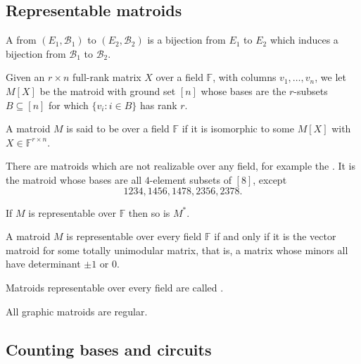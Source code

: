 \subsection[matroidRealizability]{Representable matroids}

A \label{matroidIsomorphism} from
$(E_1,\mathcal{B}_1)$ to $(E_2,\mathcal{B}_2)$ is a bijection from $E_1$ to
$E_2$ which induces a bijection from $\mathcal{B}_1$ to $\mathcal{B}_2$.


Given an $r \times n$ full-rank matrix $X$ over a field $\mathbb{F}$, with
columns $v_1,\dotsc,v_n$, we let $M[X]$ be the matroid with ground set $[n]$
whose bases are the $r$-subsets $B\subseteq[n]$ for which
$\{v_i:i\in B\}$ has rank $r$.

A matroid $M$ is said to be \label{realizableMatroid} over a
field $\mathbb{F}$ if it is isomorphic to some $M[X]$ with
$X \in \mathbb{F}^{r \times n }$.

There are matroids which are not realizable over any field, for example the
\label{vamosMatroid}.
It is the matroid whose bases are all $4$-element subsets of $[8]$, except
\[
1234, 1456, 1478, 2356, 2378.
\]

\begin{figure}
\end{figure}


\begin{theorem}
If $M$ is representable over $\mathbb{F}$ then so is $M^*$.
\end{theorem}


\begin{theorem}
A matroid $M$ is representable over every field $\mathbb{F}$ if and only if
it is the vector matroid for some totally unimodular matrix, that is, a matrix
whose minors all have determinant $\pm 1$ or $0$.
\end{theorem}
\label{matroidRegular}
Matroids representable over every field are called
.\label{regularMatroid}

\begin{theorem}
All graphic matroids are regular.
\end{theorem}


\subsection[matroidBasisCircuitBound]{Counting bases and circuits}

